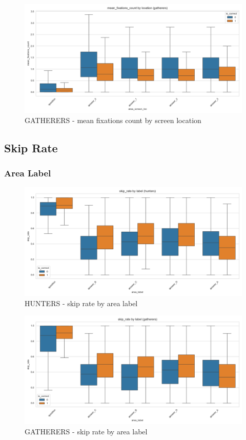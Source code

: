 \documentclass{article}
\begin{document}
\begin{figure}[H]
    \centering
    \includegraphics[width=0.8\linewidth]{plots/boxplots/boxplot_area_screen_loc_mean_fixations_count_gatherers.png}
    \caption{GATHERERS - mean fixations count by screen location}
    \label{fig:fc_gath_sl}
\end{figure}



\subsection{Skip Rate}
\subsubsection{Area Label}

\begin{figure}[H]
    \centering
    \includegraphics[width=0.8\linewidth]{plots/boxplots/boxplot_area_label_skip_rate_hunters.png}
    \caption{HUNTERS - skip rate by area label}
    \label{fig:sr_hunt_al}
\end{figure}

\begin{figure}[H]
    \centering
    \includegraphics[width=0.8\linewidth]{plots/boxplots/boxplot_area_label_skip_rate_gatherers.png}
    \caption{GATHERERS - skip rate by area label}
    \label{fig:sr_gath_al}
\end{figure}
\end{document}
